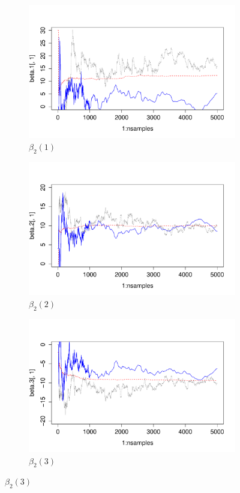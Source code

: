 \documentclass[12pt]{article}
\begin{document}
\clearpage
\begin{figure}[h!]
\centering
\begin{subfigure}[t]{.6\textwidth}
\caption{$\beta_{2}(1)$}
\includegraphics[width = \textwidth]{fig4_beta1.PDF}
\end{subfigure}
\begin{subfigure}[t]{.6\textwidth}
\caption{$\beta_{2}(2)$}
\includegraphics[width = \textwidth]{fig4_beta2.PDF}
\end{subfigure}
\begin{subfigure}[t]{.6\textwidth}
\caption{$\beta_{2}(3)$}
\includegraphics[width = \textwidth]{fig4_beta3.PDF}

\end{subfigure}
\end{figure}
\end{document}
